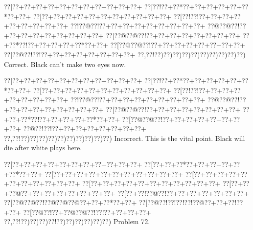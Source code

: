 \documentclass[a5paper]{article}
\begin{document}
\begin{center}
{\goo
\0??[\0??+\0??+\0??+\0??+\0??+\0??+\0??+\0??+\0??+\0??+\0??+
\0??[\0??!\0??+\0??*\0??+\0??+\0??+\0??+\0??+\0??*\0??+\0??+
\0??[\0??+\0??+\0??+\0??+\0??+\0??+\0??+\0??+\0??+\0??+\0??+
\0??[\0??!\0??!\0??+\0??+\0??+\0??+\0??+\0??+\0??+\0??+\0??+
\0??!\0??@\0??!\0??+\0??+\0??+\0??+\0??+\0??+\0??+\0??+\0??+
\0??@\0??@\0??!\0??+\0??+\0??+\0??+\0??+\0??+\0??+\0??+\0??+
\0??[\0??@\0??@\0??!\0??+\0??+\0??+\0??+\0??+\0??+\0??+\0??+
\0??+\0??*\0??!\0??+\0??+\0??+\0??+\0??*\0??+\0??+
\0??[\0??@\0??@\0??!\0??+\0??+\0??+\0??+\0??+\0??+\0??+\0??+
\0??[\0??@\0??!\0??!\0??+\0??+\0??+\0??+\0??+\0??+\0??+\0??+
\0??,\0??!\0??)\0??)\0??)\0??)\0??)\0??)\0??)\0??)\0??)\0??)
}
Correct. Black can't make two eyes now.

\end{center}
\begin{center}
{\goo
\0??[\0??+\0??+\0??+\0??+\0??+\0??+\0??+\0??+\0??+\0??+\0??+
\0??[\0??!\0??+\0??*\0??+\0??+\0??+\0??+\0??+\0??*\0??+\0??+
\0??[\0??+\0??+\0??+\0??+\0??+\0??+\0??+\0??+\0??+\0??+\0??+
\0??[\0??!\0??!\0??+\0??+\0??+\0??+\0??+\0??+\0??+\0??+\0??+
\0??!\0??@\0??!\0??+\0??+\0??+\0??+\0??+\0??+\0??+\0??+\0??+
\0??@\0??@\0??!\0??+\0??+\0??+\0??+\0??+\0??+\0??+\0??+\0??+
\0??[\0??@\0??@\0??!\0??+\0??+\0??+\0??+\0??+\0??+\0??+\0??+
\0??+\0??+\0??*\0??!\0??+\0??+\0??+\0??+\0??*\0??+\0??+
\0??[\0??@\0??@\0??!\0??+\0??+\0??+\0??+\0??+\0??+\0??+\0??+
\0??@\0??!\0??!\0??+\0??+\0??+\0??+\0??+\0??+\0??+\0??+
\0??,\0??!\0??)\0??)\0??)\0??)\0??)\0??)\0??)\0??)\0??)\0??)
}
Incorrect. This is the vital point. Black will die after white plays here.

\end{center}
\newpage
\begin{center}
{\goo
\0??[\0??+\0??+\0??+\0??+\0??+\0??+\0??+\0??+\0??+\0??+\0??+
\0??[\0??+\0??+\0??*\0??+\0??+\0??+\0??+\0??+\0??*\0??+\0??+
\0??[\0??+\0??+\0??+\0??+\0??+\0??+\0??+\0??+\0??+\0??+\0??+
\0??[\0??+\0??+\0??+\0??+\0??+\0??+\0??+\0??+\0??+\0??+\0??+
\0??[\0??+\0??+\0??+\0??+\0??+\0??+\0??+\0??+\0??+\0??+\0??+
\0??[\0??+\0??+\0??@\0??+\0??+\0??+\0??+\0??+\0??+\0??+\0??+
\0??[\0??+\0??!\0??@\0??!\0??+\0??+\0??+\0??+\0??+\0??+\0??+
\0??[\0??@\0??@\0??!\0??@\0??@\0??@\0??+\0??+\0??*\0??+\0??+
\0??[\0??@\0??!\0??!\0??!\0??!\0??@\0??+\0??+\0??!\0??+\0??+
\0??[\0??@\0??!\0??+\0??@\0??@\0??!\0??!\0??+\0??+\0??+\0??+
\0??,\0??!\0??)\0??)\0??)\0??!\0??)\0??)\0??)\0??)\0??)\0??)
}
Problem 72.

\end{center}
\end{document}
